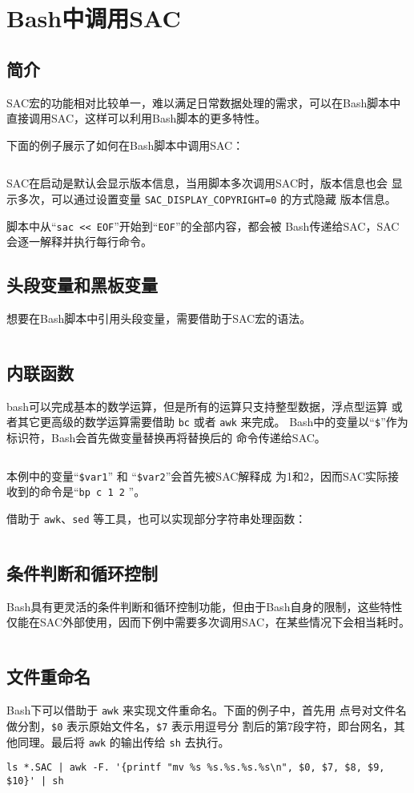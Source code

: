 \section{Bash中调用SAC}
\label{sec:sac-bash}

\subsection{简介}
SAC宏的功能相对比较单一，难以满足日常数据处理的需求，可以在Bash脚本中
直接调用SAC，这样可以利用Bash脚本的更多特性。

下面的例子展示了如何在Bash脚本中调用SAC：
\inputminted{bash}{./call-in-script/simple-script.sh}

SAC在启动是默认会显示版本信息，当用脚本多次调用SAC时，版本信息也会
显示多次，可以通过设置变量 \verb|SAC_DISPLAY_COPYRIGHT=0| 的方式隐藏
版本信息。

脚本中从``\texttt{sac << EOF}''开始到``\texttt{EOF}''的全部内容，都会被
Bash传递给SAC，SAC会逐一解释并执行每行命令。

\subsection{头段变量和黑板变量}
想要在Bash脚本中引用头段变量，需要借助于SAC宏的语法。
\inputminted{bash}{./call-in-script/variables.sh}

\subsection{内联函数}
bash可以完成基本的数学运算，但是所有的运算只支持整型数据，浮点型运算
或者其它更高级的数学运算需要借助 \texttt{bc} 或者 \texttt{awk} 来完成。
Bash中的变量以``\verb|$|''作为标识符，Bash会首先做变量替换再将替换后的
命令传递给SAC。
\inputminted{bash}{./call-in-script/arithmetic-functions.sh}

本例中的变量``\verb|$var1|'' 和 ``\verb|$var2|''会首先被SAC解释成
为1和2，因而SAC实际接收到的命令是``\texttt{bp c 1 2} ''。

借助于 \texttt{awk}、\texttt{sed} 等工具，也可以实现部分字符串处理函数：
\inputminted{bash}{./call-in-script/string-functions.sh}

\subsection{条件判断和循环控制}
Bash具有更灵活的条件判断和循环控制功能，但由于Bash自身的限制，这些特性
仅能在SAC外部使用，因而下例中需要多次调用SAC，在某些情况下会相当耗时。
\inputminted{bash}{./call-in-script/do-loops.sh}

\subsection{文件重命名}
\label{subsec:rename-in-bash}
Bash下可以借助于 \texttt{awk} 来实现文件重命名。下面的例子中，首先用
点号对文件名做分割，\verb|$0| 表示原始文件名，\verb|$7| 表示用逗号分
割后的第7段字符，即台网名，其他同理。最后将 \texttt{awk} 的输出传给
\texttt{sh} 去执行。
\begin{verbatim}
ls *.SAC | awk -F. '{printf "mv %s %s.%s.%s.%s\n", $0, $7, $8, $9, $10}' | sh
\end{verbatim}
